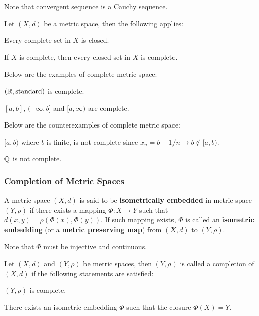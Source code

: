 \documentclass[a4paper,12pt]{article}
\begin{document}
Note that convergent sequence is a Cauchy sequence.

\begin{pst}
  Let $(X,d)$ be a metric space, then the following applies:

  \begin{alist}
    \item Every complete set in $X$ is closed.
    \item If $X$ is complete, then every closed set in $X$ is complete.
  \end{alist}
\end{pst}\n

\begin{exm}
  Below are the examples of complete metric space:

  \begin{alist}
    \item $(\mathbb{R},\text{standard})$ is complete.
    \item $[a,b]$, $(-\infty,b]$ and $[a,\infty)$ are complete.
  \end{alist}

  Below are the counterexamples of complete metric space:

  \begin{alist}
    \item $[a,b)$ where $b$ is finite, is not complete since $x_{n}=b-1/n\to b\not\in[a,b)$.
    \item $\mathbb{Q}$ is not complete.
  \end{alist}
\end{exm}

\subsubsection{Completion of Metric Spaces}
\begin{dft}
  A metric space $(X,d)$ is said to be \textbf{isometrically embedded} in metric space $(Y,\rho)$ if there exists a mapping $\Phi:X\to Y$ such that $d(x,y)=\rho(\Phi(x),\Phi(y))$. If such mapping exists, $\Phi$ is called an \textbf{isometric embedding} (or a \textbf{metric preserving map}) from $(X,d)$ to $(Y,\rho)$.
\end{dft}\n

Note that $\Phi$ must be injective and continuous.

\begin{dft}
  Let $(X,d)$ and $(Y,\rho)$ be metric spaces, then $(Y,\rho)$ is called a completion of $(X,d)$ if the following statements are satisfied:

  \begin{alist}
    \item $(Y,\rho)$ is complete.
    \item There exists an isometric embedding $\Phi$ such that the closure $\overline{\Phi(X)}=Y$.
  \end{alist}
\end{dft}\n
\end{document}
